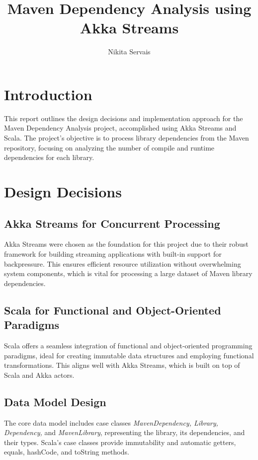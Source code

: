\documentclass{article}
\title{Maven Dependency Analysis using Akka Streams}
\author{Nikita Servais}
\begin{document}
    \maketitle

    \section{Introduction}
    This report outlines the design decisions and implementation approach for the Maven Dependency Analysis project, accomplished using Akka Streams and Scala. The project's objective is to process library dependencies from the Maven repository, focusing on analyzing the number of compile and runtime dependencies for each library.

    \section{Design Decisions}

    \subsection{Akka Streams for Concurrent Processing}
    Akka Streams were chosen as the foundation for this project due to their robust framework for building streaming applications with built-in support for backpressure. This ensures efficient resource utilization without overwhelming system components, which is vital for processing a large dataset of Maven library dependencies.

    \subsection{Scala for Functional and Object-Oriented Paradigms}
    Scala offers a seamless integration of functional and object-oriented programming paradigms, ideal for creating immutable data structures and employing functional transformations. This aligns well with Akka Streams, which is built on top of Scala and Akka actors.

    \subsection{Data Model Design}
    The core data model includes case classes \textit{MavenDependency, Library, Dependency,} and \textit{MavenLibrary}, representing the library, its dependencies, and their types. Scala's case classes provide immutability and automatic getters, equals, hashCode, and toString methods.
\end{document}
